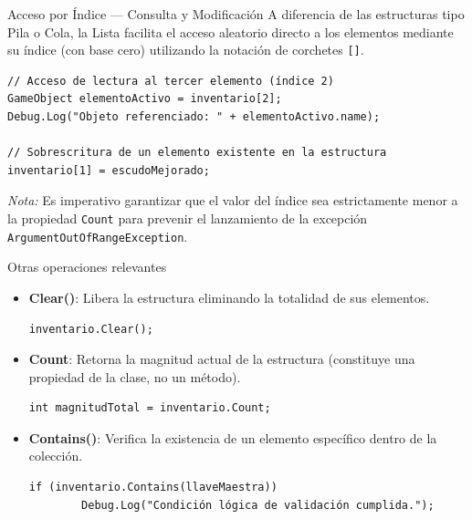 \documentclass{beamer}
\begin{document}
\begin{frame}[fragile]{Acceso por Índice — Consulta y Modificación}
A diferencia de las estructuras tipo Pila o Cola, la Lista facilita el acceso aleatorio directo a los elementos mediante su índice (con base cero) utilizando la notación de corchetes \texttt{[]}.

\begin{lstlisting}[style=CSharpStyle]
// Acceso de lectura al tercer elemento (índice 2)
GameObject elementoActivo = inventario[2];
Debug.Log("Objeto referenciado: " + elementoActivo.name);

// Sobrescritura de un elemento existente en la estructura
inventario[1] = escudoMejorado;
\end{lstlisting}

\textit{Nota:} Es imperativo garantizar que el valor del índice sea estrictamente menor a la propiedad \texttt{Count} para prevenir el lanzamiento de la excepción \texttt{ArgumentOutOfRangeException}.
\end{frame}

\begin{frame}[fragile]{Otras operaciones relevantes}
\begin{itemize}
    \item \textbf{Clear()}: Libera la estructura eliminando la totalidad de sus elementos.
    \begin{lstlisting}[style=CSharpStyle]
    inventario.Clear();
    \end{lstlisting}

    \item \textbf{Count}: Retorna la magnitud actual de la estructura (constituye una propiedad de la clase, no un método).
    \begin{lstlisting}[style=CSharpStyle]
    int magnitudTotal = inventario.Count;
    \end{lstlisting}

    \item \textbf{Contains()}: Verifica la existencia de un elemento específico dentro de la colección.
    \begin{lstlisting}[style=CSharpStyle]
    if (inventario.Contains(llaveMaestra))
        Debug.Log("Condición lógica de validación cumplida.");
    \end{lstlisting}
\end{itemize}
\end{frame}
\end{document}
